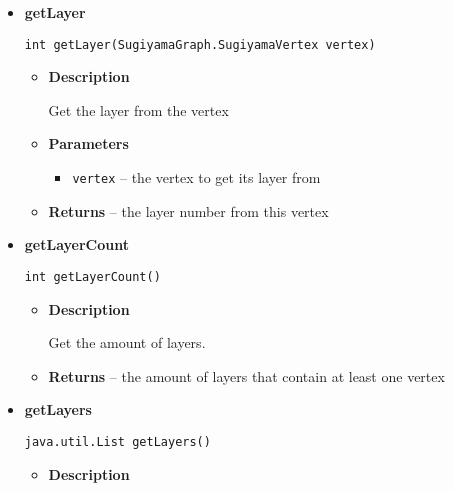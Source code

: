 {{{{{\begin{itemize}
{\begin{itemize}
{Get all vertices from a certain layer.
}
\item{
{\bf  Parameters}
  \begin{itemize}
   \item{
\texttt{layerNum} -- the layer number to get all vertices from}
  \end{itemize}
}%
\item{{\bf  Returns} -- 
a list of all vertices which are on this layer 
}%
\end{itemize}
}%
\item{ 
{\bf  getLayer}\\
\begin{lstlisting}[frame=none]
int getLayer(SugiyamaGraph.SugiyamaVertex vertex)\end{lstlisting} %
\begin{itemize}
\item{
{\bf  Description}

Get the layer from the vertex
}
\item{
{\bf  Parameters}
  \begin{itemize}
   \item{
\texttt{vertex} -- the vertex to get its layer from}
  \end{itemize}
}%
\item{{\bf  Returns} -- 
the layer number from this vertex 
}%
\end{itemize}
}%
\item{ 
{\bf  getLayerCount}\\
\begin{lstlisting}[frame=none]
int getLayerCount()\end{lstlisting} %
\begin{itemize}
\item{
{\bf  Description}

Get the amount of layers.
}
\item{{\bf  Returns} -- 
the amount of layers that contain at least one vertex 
}%
\end{itemize}
}%
\item{ 
{\bf  getLayers}\\
\begin{lstlisting}[frame=none]
java.util.List getLayers()\end{lstlisting} %
\begin{itemize}
\item{
{\bf  Description}

}
\end{itemize}}
\end{itemize}}}}}}
